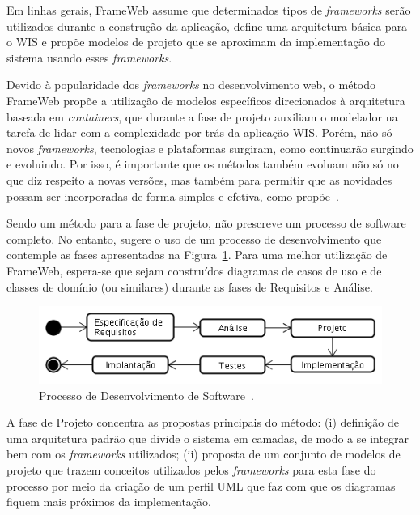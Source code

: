 Em linhas gerais, FrameWeb assume que determinados tipos de \textit{frameworks} serão utilizados durante a construção da aplicação, define uma arquitetura básica para o WIS e propõe modelos de projeto que se aproximam da implementação do sistema usando esses \textit{frameworks}.

Devido à popularidade dos \textit{frameworks} no desenvolvimento web, o método FrameWeb propõe a utilização de modelos específicos direcionados à arquitetura baseada em \textit{containers}, que durante a fase de projeto auxiliam o modelador na tarefa de lidar com a complexidade por trás da aplicação WIS. Porém, não só novos \textit{frameworks}, tecnologias e plataformas surgiram, como continuarão surgindo e evoluindo. Por isso, é importante que os métodos também evoluam não só no que diz respeito a novas versões, mas também para permitir que as novidades possam ser incorporadas de forma simples e efetiva, como propõe~.

Sendo um método para a fase de projeto, não prescreve um processo de software completo. No entanto, sugere o uso de um processo de desenvolvimento que contemple as fases apresentadas na Figura~\ref{fig-referencial-processo-software}. Para uma melhor utilização de FrameWeb, espera-se que sejam construídos diagramas de casos de uso e de classes de domínio (ou similares) durante as fases de Requisitos e Análise. 

\begin{figure}[h]
	\centering
	\includegraphics[width=1\textwidth]{figuras/referencial/fig-referencial-processo-software}
	\caption{Processo de Desenvolvimento de Software~\cite{vitorFrameWeb}.}
	\label{fig-referencial-processo-software}
\end{figure}

A fase de Projeto concentra as propostas principais do método: (i) definição de uma arquitetura padrão que divide o sistema em camadas, de modo a se integrar bem com os \textit{frameworks} utilizados; (ii) proposta de um conjunto de modelos de projeto que trazem conceitos utilizados pelos \textit{frameworks} para esta fase do processo por meio da criação de um perfil UML que faz com que os diagramas fiquem mais próximos da implementação.

